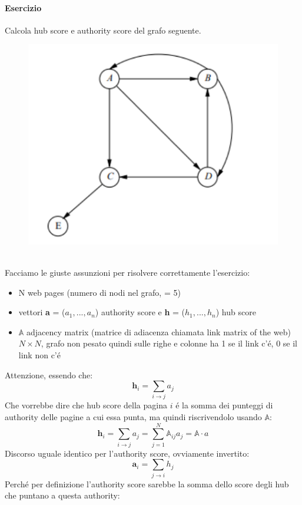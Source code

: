 \paragraph{Esercizio} Calcola hub score e authority score del grafo seguente.
\\
\begin{figure}[th]
    \centering
    \includegraphics[scale=0.5]{GraphImportance//img/exercise.png}
\end{figure}
\\ 
Facciamo le giuste assunzioni per risolvere correttamente l'esercizio: 
\begin{itemize}
    \item N web pages (numero di nodi nel grafo, = 5)
    \item vettori \textbf{a} = ($a_1, ..., a_n$) authority score e \textbf{h} = ($h_1, ..., h_n$) hub score
    \item $\mathbb{A}$ adjacency matrix (matrice di adiacenza chiamata link matrix of the web) $N\times N$, grafo non pesato quindi sulle righe e colonne ha 1 se il link c'é, 0 se il link non c'é
\end{itemize}
Attenzione, essendo che:
\[
\textbf{h}_i = \sum_{i \rightarrow j} a_j
\]
Che vorrebbe dire che hub score della pagina $i$ é la somma dei punteggi di authority delle pagine a cui essa punta, ma quindi riscrivendolo usando $\mathbb{A}$:
\[
\textbf{h}_i = \sum_{i \rightarrow j} a_j = \sum_{j=1}^N \mathbb{A}_{ij} a_j = \mathbb{A} \cdot a
\]
Discorso uguale identico per l'authority score, ovviamente invertito: 
\[
\textbf{a}_i = \sum_{j \rightarrow i} h_j
\]
Perché per definizione l'authority score sarebbe la somma dello score degli hub che puntano a questa authority:
